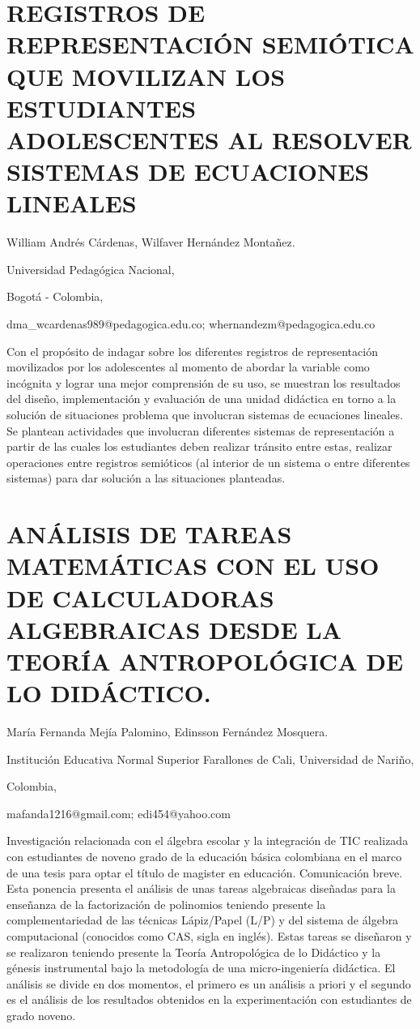 \section{REGISTROS DE REPRESENTACIÓN SEMIÓTICA QUE MOVILIZAN LOS ESTUDIANTES
ADOLESCENTES AL RESOLVER SISTEMAS DE ECUACIONES LINEALES}

\begin{datos}

William Andrés Cárdenas, Wilfaver Hernández Montañez. 

Universidad Pedagógica Nacional,

Bogotá - Colombia,

dma\_wcardenas989@pedagogica.edu.co; whernandezm@pedagogica.edu.co

\end{datos}

Con el propósito de indagar sobre los diferentes registros de representación
movilizados por los adolescentes al momento de abordar la variable
como incógnita y lograr una mejor comprensión de su uso, se muestran
los resultados del diseño, implementación y evaluación de una unidad
didáctica en torno a la solución de situaciones problema que involucran
sistemas de ecuaciones lineales. Se plantean actividades que involucran
diferentes sistemas de representación a partir de las cuales los estudiantes
deben realizar tránsito entre estas, realizar operaciones entre registros
semióticos (al interior de un sistema o entre diferentes sistemas)
para dar solución a las situaciones planteadas.


\section{ANÁLISIS DE TAREAS MATEMÁTICAS CON EL USO DE CALCULADORAS ALGEBRAICAS
DESDE LA TEORÍA ANTROPOLÓGICA DE LO DIDÁCTICO.}

\begin{datos}

María Fernanda Mejía Palomino, Edinsson Fernández Mosquera.

Institución Educativa Normal Superior Farallones de Cali, Universidad
de Nariño,

Colombia,

mafanda1216@gmail.com; edi454@yahoo.com

\end{datos}

Investigación relacionada con el álgebra escolar y la integración
de TIC realizada con estudiantes de noveno grado de la educación básica
colombiana en el marco de una tesis para optar el título de magister
en educación. Comunicación breve. Esta ponencia presenta el análisis
de unas tareas algebraicas diseñadas para la enseñanza de la factorización
de polinomios teniendo presente la complementariedad de las técnicas
Lápiz/Papel (L/P) y del sistema de álgebra computacional (conocidos
como CAS, sigla en inglés). Estas tareas se diseñaron y se realizaron
teniendo presente la Teoría Antropológica de lo Didáctico y la génesis
instrumental bajo la metodología de una micro-ingeniería didáctica.
El análisis se divide en dos momentos, el primero es un análisis a
priori y el segundo es el análisis de los resultados obtenidos en
la experimentación con estudiantes de grado noveno. 


